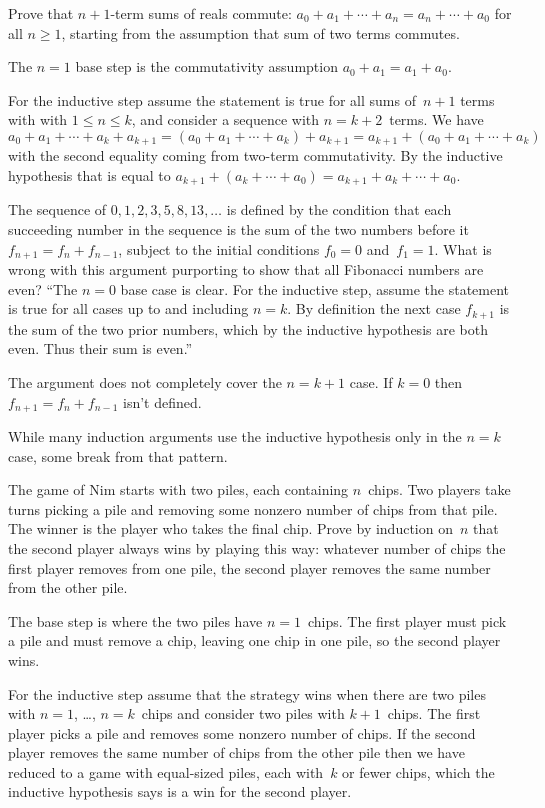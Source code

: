 \documentclass{ibl}  %
\begin{document}
\begin{ex}
Prove that $n+1$-term sums of reals commute:
$a_0+a_1+\cdots+a_n=a_n+\cdots+a_0$ for all $n\geq 1$,
starting from the assumption that sum of two terms commutes.
\begin{ans}
The $n=1$ base step is the commutativity assumption $a_0+a_1=a_1+a_0$.

For the inductive step assume the statement is true for all 
sums of~$n+1$ terms with 
with $1\leq n\leq k$, and consider a sequence with $n=k+2$~terms.
We have 
$a_0+a_1+\cdots+a_k+a_{k+1}
=(a_0+a_1+\cdots+a_k)+a_{k+1}
=a_{k+1}+(a_0+a_1+\cdots+a_k)$ with the second equality coming from
two-term commutativity.
By the inductive hypothesis that is equal to 
$a_{k+1}+(a_k+\cdots+a_0)=a_{k+1}+a_k+\cdots+a_0$.
\end{ans}
\end{ex}

\begin{ex}
The sequence of 
$0,1,2,3,5,8,13, \ldots$ is defined by the condition that 
each succeeding number in the sequence is the sum of the 
two numbers before it $f_{n+1}=f_n+f_{n-1}$, subject to the initial conditions
$f_0=0$ and~$f_1=1$.
What is wrong with this argument purporting to show that
all Fibonacci numbers are even?
``The $n=0$ base case is clear.  For the inductive step, assume the statement 
is true for all cases up to and including $n=k$.
By definition 
the next case $f_{k+1}$ is the sum of the two prior numbers, which by
the inductive hypothesis are both even.  
Thus their sum is even.''   
\begin{ans}
The argument does not completely cover the $n=k+1$ case.
If $k=0$ then $f_{n+1}=f_n+f_{n-1}$ isn't defined.  
\end{ans}
\end{ex}

While many induction arguments use the inductive 
hypothesis only in the $n=k$ case,
some break from that pattern.

\begin{ex}
The game of Nim starts with two piles, each containing $n$~chips.
Two players take turns picking a pile and removing 
some nonzero number of chips from that pile. 
The winner is the player who takes the final chip.
Prove by induction on~$n$ that the second player always wins by
playing this way: whatever number of chips the first player removes
from one pile, the second player removes the same number from the other pile.
\begin{ans}
The base step is where the two piles have $n=1$~chips.
The first player must pick a pile and must remove a chip, leaving one chip
in one pile, so the second player wins.

For the inductive step assume that the strategy wins when there are two piles
with $n=1$, \ldots, $n=k$~chips and consider two piles with
$k+1$~chips.
The first player picks a pile and removes some nonzero number of chips.
If the second player removes the same number of chips from the other
pile then we have reduced to a game with equal-sized piles, each
with~$k$ or fewer chips, which the inductive hypothesis says
is a win for the second player.  
\end{ans}
\end{ex}
\end{document}
